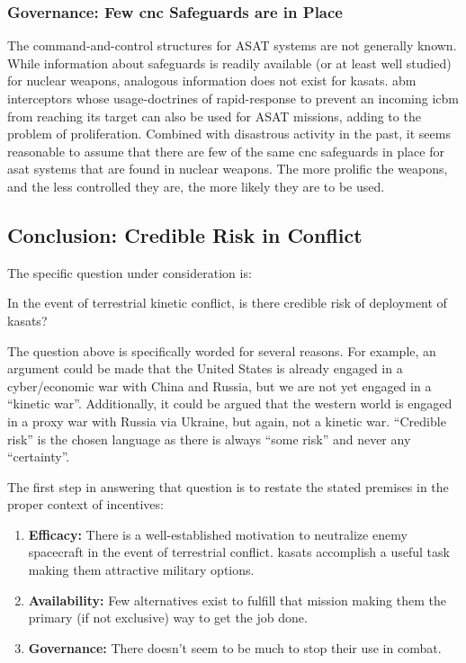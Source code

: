 \subsubsection{Governance: Few \ac{cnc} Safeguards are in Place}
The command-and-control structures for ASAT systems are not generally
known.  While information about safeguards is readily available (or at
least well studied) for nuclear weapons, analogous information does
not exist for \acp{kasat}.  \ac{abm} interceptors whose
usage-doctrines of rapid-response to prevent an incoming \ac{icbm}
from reaching its target can also be used for ASAT missions, adding to
the problem of proliferation.  Combined with disastrous activity in
the past, it seems reasonable to assume that there are few of the same
\ac{cnc} safeguards in place for \ac{asat} systems that are found in
nuclear weapons.  The more prolific the weapons, and the less
controlled they are, the more likely they are to be used.

\subsection{Conclusion: Credible Risk in Conflict}

The specific question under consideration is:

\begin{blockquote}
  In the event of terrestrial kinetic conflict, is there credible risk
  of deployment of \acfp{kasat}?
\end{blockquote}

The question above is specifically worded for several reasons.  For
example, an argument could be made that the United States is already
engaged in a cyber/economic war with China and Russia, but we are not
yet engaged in a ``kinetic war''.  Additionally, it could be argued
that the western world is engaged in a proxy war with Russia via
Ukraine, but again, not a kinetic war.  ``Credible risk'' is the
chosen language as there is always ``some risk'' and never any
``certainty''.

The first step in answering that question is to restate the stated
premises in the proper context of incentives:

\begin{enumerate}

\item {\bf Efficacy:} There is a well-established motivation to
  neutralize enemy spacecraft in the event of terrestrial
  conflict.\cite{big-risks} \acfp{kasat} accomplish a useful task
  making them attractive military options.

\item {\bf Availability:} Few alternatives exist to fulfill that
  mission making them the primary (if not exclusive) way to get the
  job done.

\item {\bf Governance:} There doesn't seem to be much to stop their
  use in combat.

\end{enumerate}

